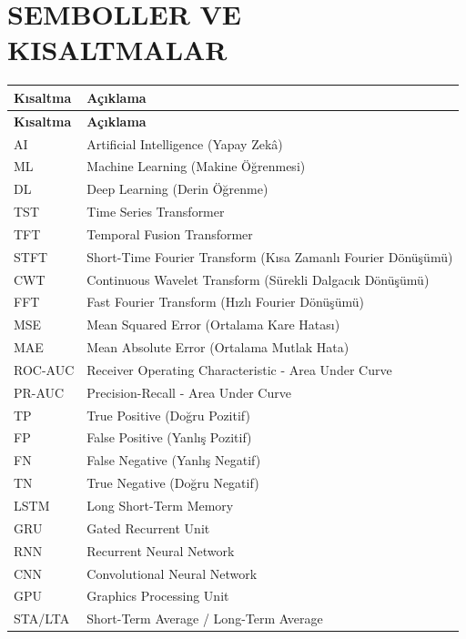 \chapter*{SEMBOLLER VE KISALTMALAR}

\renewcommand{\arraystretch}{0.95}

\begin{longtable}{@{}p{2.5cm}p{10.5cm}@{}}
\toprule
\textbf{Kısaltma} & \textbf{Açıklama} \\
\midrule
\endfirsthead
\toprule
\textbf{Kısaltma} & \textbf{Açıklama} \\
\midrule
\endhead
\endfoot
\bottomrule
\endlastfoot
AI & Artificial Intelligence (Yapay Zekâ) \\
ML & Machine Learning (Makine Öğrenmesi) \\
DL & Deep Learning (Derin Öğrenme) \\
TST & Time Series Transformer \\
TFT & Temporal Fusion Transformer \\
STFT & Short-Time Fourier Transform (Kısa Zamanlı Fourier Dönüşümü) \\
CWT & Continuous Wavelet Transform (Sürekli Dalgacık Dönüşümü) \\
FFT & Fast Fourier Transform (Hızlı Fourier Dönüşümü) \\
MSE & Mean Squared Error (Ortalama Kare Hatası) \\
MAE & Mean Absolute Error (Ortalama Mutlak Hata) \\
ROC-AUC & Receiver Operating Characteristic - Area Under Curve \\
PR-AUC & Precision-Recall - Area Under Curve \\
TP & True Positive (Doğru Pozitif) \\
FP & False Positive (Yanlış Pozitif) \\
FN & False Negative (Yanlış Negatif) \\
TN & True Negative (Doğru Negatif) \\
LSTM & Long Short-Term Memory \\
GRU & Gated Recurrent Unit \\
RNN & Recurrent Neural Network \\
CNN & Convolutional Neural Network \\
GPU & Graphics Processing Unit \\
STA/LTA & Short-Term Average / Long-Term Average \\

\end{longtable}
